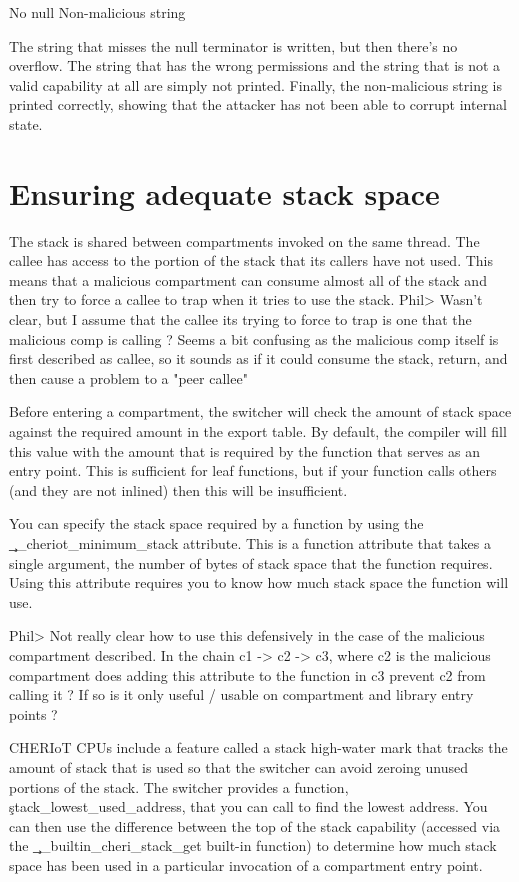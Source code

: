 \begin{console}
No null
Non-malicious string
\end{console}

The string that misses the null terminator is written, but then there's no overflow.
The string that has the wrong permissions and the string that is not a valid capability at all are simply not printed.
Finally, the non-malicious string is printed correctly, showing that the attacker has not been able to corrupt internal state.

\section{Ensuring adequate stack space}

The stack is shared between compartments invoked on the same thread.
The callee has access to the portion of the stack that its callers have not used.
This means that a malicious compartment can consume almost all of the stack and then try to force a callee to trap when it tries to use the stack.
Phil> Wasn't clear, but I assume that the callee its trying to force to trap is one that the malicious comp is calling ?  Seems a bit confusing as the malicious comp itself is first described as callee, so it sounds as if it could consume the stack, return, and then cause a problem to a "peer callee" 

Before entering a compartment, the switcher will check the amount of stack space against the required amount in the export table.
By default, the compiler will fill this value with the amount that is required by the function that serves as an entry point.
This is sufficient for leaf functions, but if your function calls others (and they are not inlined) then this will be insufficient.

You can specify the stack space required by a function by using the \c{__cheriot_minimum_stack} attribute.
This is a function attribute that takes a single argument, the number of bytes of stack space that the function requires.
Using this attribute requires you to know how much stack space the function will use.

Phil> Not really clear how to use this defensively in the case of the malicious compartment described.   In the chain c1 -> c2 -> c3, where c2 is the malicious compartment does adding this attribute to the function in c3 prevent c2 from calling it ?  If so is it only useful / usable on compartment and library entry points ? 

CHERIoT CPUs include a feature called a stack high-water mark that tracks the amount of stack that is used so that the switcher can avoid zeroing unused portions of the stack.
The switcher provides a function, \c{stack_lowest_used_address}, that you can call to find the lowest address.
You can then use the difference between the top of the stack capability (accessed via the \c{__builtin_cheri_stack_get} built-in function) to determine how much stack space has been used in a particular invocation of a compartment entry point.

